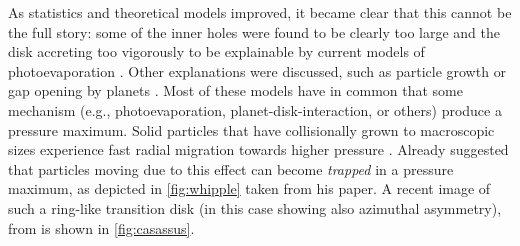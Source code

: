 \documentclass[10pt,fleqn,twoside]{article}
\begin{document}
As statistics and theoretical models improved, it became clear that
this cannot be the full story: some of the inner holes were found to
be clearly too large and the disk accreting too vigorously to be
explainable by current models of photoevaporation
\citep[i.e.\ Type 2 TDs,][]{2010MNRAS.401.1415O,2011MNRAS.412...13O}.
Other explanations were discussed, such as particle growth
\citep{2005A&A...434..971D,2005ApJ...625..414T,2012A&A...544A..79B} or
gap opening by planets
\citep{2004A&A...425L...9P,2006A&A...453.1129P,2006MNRAS.373.1619R,
2012A&A...545A..81P,2012ApJ...755....6Z}. Most of these models have in
common that some mechanism (e.g., photoevaporation,
planet-disk-interaction, or others) produce a pressure maximum.
Solid particles that have collisionally grown to macroscopic sizes
experience fast radial migration towards higher pressure
\citep{1972fpp..conf..211W,1977MNRAS.180...57W,1986Icar...67..375N}.
Already \citet{1972fpp..conf..211W} suggested that particles moving
due to this effect can become \textit{trapped} in a pressure maximum,
as depicted in \autoref{fig:whipple} taken from his paper. A recent
image of such a ring-like transition disk (in this case showing also
azimuthal asymmetry), from \cite{2013Natur.493..191C} is shown in
\autoref{fig:casassus}.
\end{document}
